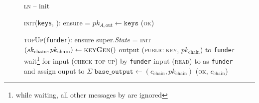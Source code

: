 \begin{figure}[H]
  \begin{processbox}{\textsc{ln} -- init}
    \begin{algorithmic}[1]
      \State \textsc{init}(\texttt{keys}, \dave):
      \Indent
        \State ensure \dave = \alice
        \State $pk_{A, \mathrm{out}} \gets \texttt{keys}$
        \State \Return (\textsc{ok})
      \EndIndent
      \Statex

      \State \textsc{topUp}(\texttt{funder}): 
      \Indent
        \State ensure super.\textit{State} = \textsc{init}
        \State $(sk_{\mathrm{chain}}, pk_{\mathrm{chain}}) \gets
        \textsc{keyGen}()$
        \State output (\textsc{public key}, $pk_{\mathrm{chain}}$) to
        \texttt{funder}
          \State wait\footnote{while waiting, all other messages by \dave are
          ignored} for input (\textsc{check top up}) by \texttt{funder}
          \State input (\textsc{read}) to \ledger as \texttt{funder} and assign
          ouput to $\Sigma$
        \EndWhile
        \State $\texttt{base\_output} \gets (c_{\mathrm{chain}},
        pk_{\mathrm{chain}})$
        \State \Return (\textsc{ok}, $c_{\mathrm{chain}}$)
      \EndIndent
    \end{algorithmic}
  \end{processbox}
  \caption{}
  \label{code:ln:init}
\end{figure}

